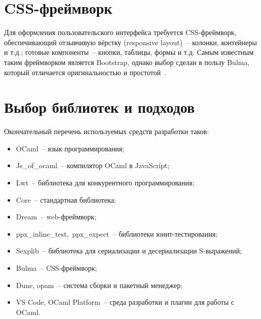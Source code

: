 \section{CSS-фреймворк}

Для оформления пользовательского интерфейса требуется CSS-фреймворк, обеспечивающий
отзывчивую вёрстку (responsive layout)~-- колонки, контейнеры и т.д.;
готовые компоненты~-- кнопки, таблицы, формы и т.д. Самым известным таким фреймворком является Bootstrap,
однако выбор сделан в пользу Bulma, который отличается оригинальностью и простотой~\cite{bulma-vs-bootstrap}.

\section{Выбор библиотек и подходов}

Окончательный перечень используемых средств разработки таков:

\begin{itemize}
      \item OCaml~-- язык программирования;
      \item Js\_of\_ocaml~-- компилятор OCaml в JavaScript;
      \item Lwt~-- библиотека для конкурентного программирования;
      \item Core~-- стандартная библиотека;
      \item Dream~-- web-фреймворк;
      \item ppx\_inline\_test,~ppx\_expect~-- библиотеки юнит-тестирования;
      \item Sexplib~-- библиотека для сериализации и десериализации S-выражений;
      \item Bulma~-- CSS-фреймворк;
      \item Dune, opam~-- система сборки и пакетный менеджер;
      \item VS Code, OCaml Platform~-- среда разработки и плагин для работы с OCaml.
\end{itemize}
